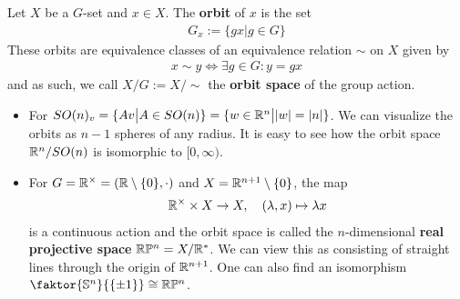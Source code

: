\begin{dfn}[]
Let $X$ be a $G$-set and $x \in X$. The \textbf{orbit} of $x$ is the set
\begin{align*}
  G_x := \{gx \big\vert g \in G\}
\end{align*}
These orbits are equivalence classes of an equivalence relation $\sim$ on $X$ given by
\begin{align*}
  x \sim y \iff \exists g \in G: y = gx
\end{align*}
and as such, we call $X/G := X/\sim$ the \textbf{orbit space} of the group action.
\end{dfn}

\begin{ex}[]
  \phantom{a}
\begin{itemize}
  \item For $SO(n)_v = \{Av \big\vert A \in SO(n)\} = \{w \in \mathbb{R}^{n} \big\vert \vert w\vert = \vert n\vert\}$.
    We can visualize the orbits as $n-1$ spheres of any radius. 
    It is easy to see how the orbit space $\mathbb{R}^{n}/SO(n)$ is isomorphic to $[0,\infty)$.

  \item For $G = \mathbb{R}^{\times} = (\mathbb{R} \setminus \{0\}, \cdot)$ and $X = \mathbb{R}^{n+1} \setminus \{0\}$, the map
    \begin{align*}
      \mathbb{R}^{\times} \times X \to X, \quad (\lambda,x) \mapsto  \lambda x
    \end{align*}
    is a continuous action and the orbit space is called the $n$-dimensional \textbf{real projective space} $\mathbb{R}\mathbb{P}^{n} = X/\mathbb{R}^{\ast}$.
    We can view this as consisting of straight lines through the origin of $\mathbb{R}^{n+1}$.
    One can also find an isomorphism $\faktor{\IS^{n}}{\{\pm 1\}} \iso \R\IP^{n}$.
\end{itemize}
\end{ex}



